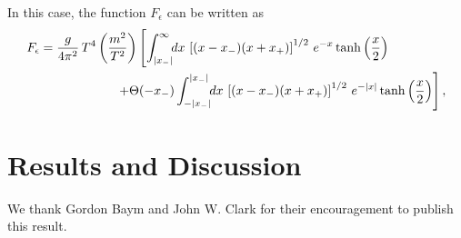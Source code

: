 \documentclass[sn-mathphys,Numbered]{sn-jnl}
\theoremstyle{thmstyleone}%
\theoremstyle{thmstyletwo}%
\theoremstyle{thmstylethree}%
\begin{document}
In this case, the function $F_\epsilon$ can be written as
\begin{align}
F_\epsilon&=\frac{g}{4\pi^2}\,T^4\left(\frac{m^2}{T^2}\right)\left[\int^\infty_{|x_-|}\!\!dx\,\left[(x-x_-)(x+x_+)\right]^{1/2}\,e^{-x}\tanh\left(\frac{x}{2}\right)\right.\notag\\
   &\qquad\qquad\qquad\left.+\Theta(-x_-)\int^{|x_-|}_{-|x_-|}\!\!dx\,\left[(x-x_-)(x+x_+)\right]^{1/2}\,e^{-|x|}\tanh\left(\frac{x}{2}\right)\right],
\end{align}







\section{Results and Discussion}\label{sec12}

 

\backmatter


We thank Gordon Baym and John W. Clark for their encouragement to publish this result.


\end{document}

